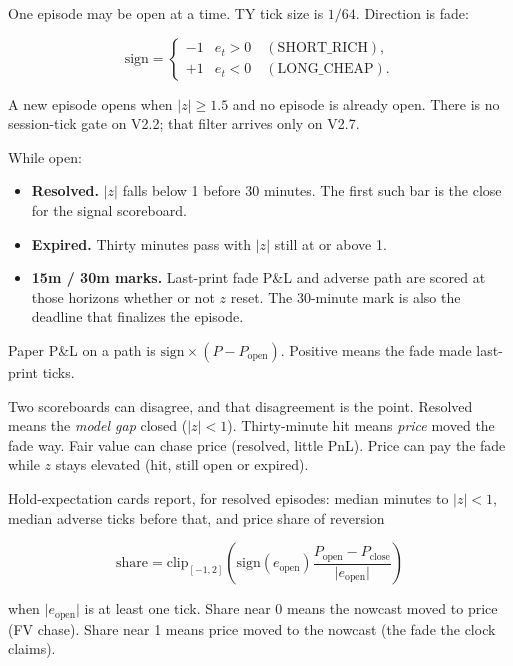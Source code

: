 \documentclass[11pt]{article}
\newcommand{\abs}[1]{\lvert #1 \rvert}
\begin{document}
One episode may be open at a time.  TY tick size is \(1/64\).
Direction is fade:

\begin{equation}
  \mathrm{sign}
  =
  \begin{cases}
    -1 & e_t > 0 \quad (\mathrm{SHORT\_RICH}), \\
    +1 & e_t < 0 \quad (\mathrm{LONG\_CHEAP}).
  \end{cases}
\end{equation}

A new episode opens when \(\abs{z}\ge 1.5\) and no episode is
already open.  There is no session-tick gate on V2.2; that filter
arrives only on V2.7.

While open:

\begin{itemize}
    \item \textbf{Resolved.}
    \(\abs{z}\) falls below 1 before 30 minutes.  The first such
    bar is the close for the signal scoreboard.
    \item \textbf{Expired.}
    Thirty minutes pass with \(\abs{z}\) still at or above 1.
    \item \textbf{15m / 30m marks.}
    Last-print fade P\&L and adverse path are scored at those
    horizons whether or not \(z\) reset.  The 30-minute mark is
    also the deadline that finalizes the episode.
\end{itemize}

Paper P\&L on a path is \(\mathrm{sign}\times(P-P_{\mathrm{open}})\).
Positive means the fade made last-print ticks.

Two scoreboards can disagree, and that disagreement is the point.
Resolved means the \emph{model gap} closed (\(\abs{z}<1\)).
Thirty-minute hit means \emph{price} moved the fade way.  Fair
value can chase price (resolved, little PnL).  Price can pay the
fade while \(z\) stays elevated (hit, still open or expired).

Hold-expectation cards report, for resolved episodes: median
minutes to \(\abs{z}<1\), median adverse ticks before that, and
price share of reversion

\begin{equation}
  \mathrm{share}
  =
  \mathrm{clip}_{[-1,2]}
  \left(
    \mathrm{sign}(e_{\mathrm{open}})
    \frac{P_{\mathrm{open}}-P_{\mathrm{close}}}{\abs{e_{\mathrm{open}}}}
  \right)
\end{equation}

when \(\abs{e_{\mathrm{open}}}\) is at least one tick.  Share near
0 means the nowcast moved to price (FV chase).  Share near 1 means
price moved to the nowcast (the fade the clock claims).
\end{document}
